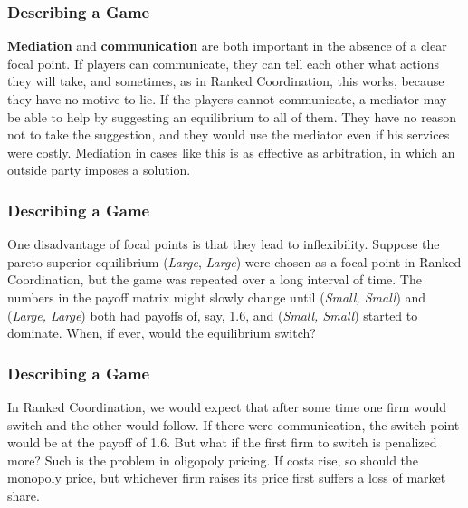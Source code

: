  \begin{frame}[fragile]\frametitle{Describing a Game}
         {\bf Mediation} and {\bf communication} are both important in the
absence of a clear focal point.  If players can communicate, they can tell each
other what actions they will take, and sometimes, as in { Ranked Coordination},
this works, because they have no motive to lie. If the players cannot
communicate, a mediator may be able to help by suggesting an equilibrium to all
of them. They have no reason not to take the suggestion, and they would use the
mediator even if his services were costly.  Mediation in cases like this is as
effective as arbitration, in which an outside party imposes a solution.

\end{frame}
 \begin{frame}[fragile]\frametitle{Describing a Game}
    One disadvantage of focal points is that they lead to inflexibility. Suppose
the pareto-superior equilibrium ({\it Large}, {\it Large}) were chosen as a
focal point in { Ranked Coordination}, but the game was repeated over a long
interval of time. The numbers in the payoff matrix might slowly change until
({\it Small, Small}) and ({\it Large, Large}) both had payoffs of, say,  1.6,
and ({\it Small, Small}) started to dominate. When, if ever, would the
equilibrium switch?

\end{frame}
 \begin{frame}[fragile]\frametitle{Describing a Game}
         In { Ranked Coordination}, we would expect that after some time one
firm would switch and the other would follow. If there were communication, the
switch point would be at the payoff of 1.6. But what if the first firm to switch
is penalized more?  Such is the problem in oligopoly pricing. If costs rise, so
should the monopoly price, but whichever firm raises its price first suffers a
loss of market share.

 \end{frame}

